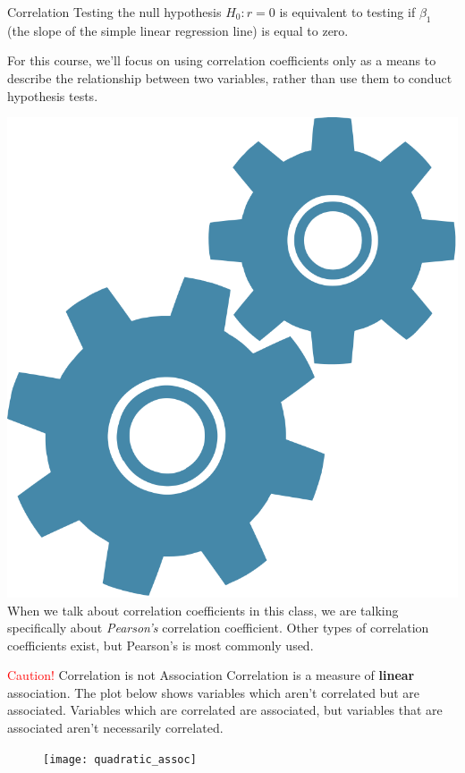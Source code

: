 \documentclass[10pt,t]{beamer}
\begin{document}
\begin{frame}{Correlation}
Testing the null hypothesis $H_0: r = 0$ is equivalent to testing if $\beta_1$ (the slope of the simple linear regression line) is equal to zero. 



\vspace{0.3cm}

For this course, we'll focus on using correlation coefficients only as a means to describe the relationship between two variables, rather than use them to conduct hypothesis tests.

\vspace{0.3cm}

\includegraphics[scale=0.02]{technical} When we talk about correlation coefficients in this class, we are talking specifically about \textit{Pearson's} correlation coefficient. Other types of correlation coefficients exist, but Pearson's is most commonly used.
\end{frame}

\begin{frame}{\textcolor{red}{Caution!} Correlation is not Association}
	Correlation is a measure of \textbf{linear} association. The plot below shows variables which aren't correlated but are associated. Variables which are correlated are associated, but variables that are associated aren't necessarily correlated.
	
	\begin{figure}
		\centering
		\texttt{[image: quadratic\_assoc]}
	\end{figure}
\end{frame}
\end{document}
